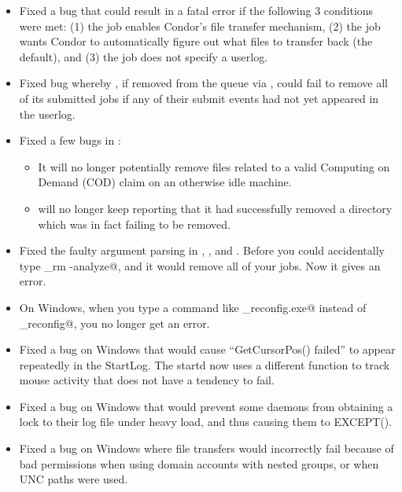 \begin{itemize}
\item Fixed a  bug that could result in a fatal error
  if the following 3 conditions were met: (1) the job enables Condor's
  file transfer mechanism, (2) the job wants Condor to automatically
  figure out what files to transfer back (the default), and (3) the
  job does not specify a userlog.

\item Fixed bug whereby , if removed from the queue via
      , could fail to remove all of its submitted jobs if
      any of their submit events had not yet appeared in the userlog.

\item Fixed a few bugs in :
  \begin{itemize}
  \item It will no longer potentially remove files related to a valid
    Computing on Demand (COD) claim on an otherwise idle machine.
  \item {} will no longer keep reporting that it had
    successfully removed a directory which was in fact failing to be
    removed.
  \end{itemize}

\item Fixed the faulty argument parsing in ,
  , and .
  Before you could accidentally type \verb@condor_rm -analyze@, and it
  would remove all of your jobs.
  Now it gives an error.

\item On Windows, when you type a command like
  \verb@condor_reconfig.exe@ instead of \verb@condor_reconfig@, you no
  longer get an error.

\item Fixed a bug on Windows that would cause ``GetCursorPos() failed''
  to appear repeatedly in the StartLog. The startd now uses a different
  function to track mouse activity that does not have a tendency to fail.

\item Fixed a bug on Windows that would prevent some 
  daemons from obtaining a lock to their log file under heavy load, and
  thus causing them to EXCEPT().

\item Fixed a bug on Windows where file transfers would incorrectly fail
because of bad permissions when using domain accounts with nested groups,
or when UNC paths were used.


\end{itemize}
